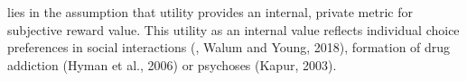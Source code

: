 lies in the assumption that utility provides an internal, private metric for subjective reward value. This utility as an internal value reflects individual choice preferences in social interactions (\cite{Ungless2004b}, Walum and Young, 2018), formation of drug addiction (Hyman et al., 2006) or psychoses (Kapur, 2003).

